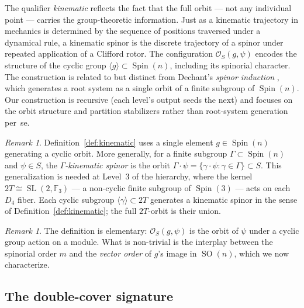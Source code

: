 \documentclass[11pt,reqno]{amsart}
\theoremstyle{plain}
\theoremstyle{definition}
\theoremstyle{remark}
\newtheorem{remark}[theorem]{Remark}
\newcommand{\F}{\mathbb{F}}
\DeclareMathOperator{\Spin}{Spin}
\DeclareMathOperator{\SO}{SO}
\DeclareMathOperator{\SL}{SL}
\begin{document}
The qualifier \emph{kinematic} reflects the fact that the full
orbit --- not any individual point --- carries the
group-theoretic information.
Just as a kinematic trajectory in mechanics is determined by
the sequence of positions traversed under a dynamical rule,
a kinematic spinor is the discrete trajectory of a spinor
under repeated application of a Clifford rotor.
The configuration $\mathcal{O}_S(g,\psi)$ encodes the
structure of the cyclic group
$\langle g \rangle \subset \Spin(n)$, including its
spinorial character.
The construction is related to but distinct from Dechant's
\emph{spinor induction} \cite{Dechant2016}, which generates
a root system as a single orbit of a finite subgroup of
$\Spin(n)$.
Our construction is recursive (each level's output seeds
the next) and focuses on the orbit structure and partition
stabilizers rather than root-system generation per~se.

\begin{remark}\label{rem:groupkinematic}
Definition~\ref{def:kinematic} uses a single element
$g \in \Spin(n)$ generating a cyclic orbit.
More generally, for a finite subgroup
$\Gamma \subset \Spin(n)$ and $\psi \in S$, the
\emph{$\Gamma$-kinematic spinor} is the orbit
$\Gamma \cdot \psi = \{\gamma \cdot \psi : \gamma \in \Gamma\}
\subset S$.
This generalization is needed at Level~3 of the hierarchy,
where the kernel $2T \cong \SL(2,\F_3)$ --- a non-cyclic
finite subgroup of $\Spin(3)$ --- acts on each $D_4$ fiber.
Each cyclic subgroup $\langle \gamma \rangle \subset 2T$
generates a kinematic spinor in the sense of
Definition~\ref{def:kinematic}; the full $2T$-orbit is
their union.
\end{remark}

\begin{remark}
The definition is elementary: $\mathcal{O}_S(g,\psi)$ is
the orbit of $\psi$ under a cyclic group action on a module.
What is non-trivial is the interplay between the spinorial
order $m$ and the \emph{vector order} of $g$'s image in
$\SO(n)$, which we now characterize.
\end{remark}

\subsection{The double-cover signature}
\end{document}
